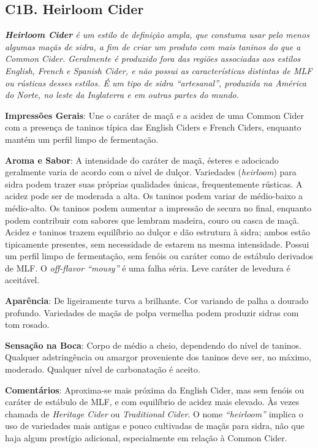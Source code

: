 \subsection*{C1B. Heirloom Cider}

\textit{\textbf{Heirloom Cider} é um estilo de definição ampla, que constuma usar pelo menos algumas maçãs de sidra, a fim de criar um produto com mais taninos do que a Common Cider. Geralmente é produzido fora das regiões associadas aos estilos English, French e Spanish Cider, e não possui as características distintas de MLF ou rústicas desses estilos. É um tipo de sidra “artesanal”, produzida na América do Norte, no leste da Inglaterra e em outras partes do mundo.}

\textbf{Impressões Gerais}: Une o caráter de maçã e a acidez de uma Common Cider com a presença de taninos típica das English Ciders e French Ciders, enquanto mantém um perfil limpo de fermentação.

\textbf{Aroma e Sabor}: A intensidade do caráter de maçã, ésteres e adocicado geralmente varia de acordo com o nível de dulçor. Variedades (\textit{heirloom}) para sidra podem trazer suas próprias qualidades únicas, frequentemente rústicas. A acidez pode ser de moderada a alta. Os taninos podem variar de médio-baixo a médio-alto. Os taninos podem aumentar a impressão de secura no final, enquanto podem contribuir com sabores que lembram madeira, couro ou casca de maçã. Acidez e taninos trazem equilíbrio ao dulçor e dão estrutura à sidra; ambos estão tipicamente presentes, sem necessidade de estarem na mesma intensidade. Possui um perfil limpo de fermentação, sem fenóis ou caráter como de estábulo derivados de MLF. O \textit{off-flavor “mousy”} é uma falha séria. Leve caráter de levedura é aceitável.

\textbf{Aparência}: De ligeiramente turva a brilhante. Cor variando de palha a dourado profundo. Variedades de maçãs de polpa vermelha podem produzir sidras com tom rosado.

\textbf{Sensação na Boca}: Corpo de médio a cheio, dependendo do nível de taninos. Qualquer adstringência ou amargor proveniente dos taninos deve ser, no máximo, moderado. Qualquer nível de carbonatação é aceito.

\textbf{Comentários}: Aproxima-se mais próxima da English Cider, mas sem fenóis ou caráter de estábulo de MLF, e com equilíbrio de acidez mais elevado. Às vezes chamada de \textit{Heritage Cider} ou \textit{Traditional Cider}. O nome \textit{“heirloom”} implica o uso de variedades mais antigas e pouco cultivadas de maçãs para sidra, não que haja algum prestígio adicional, especialmente em relação à Common Cider.

